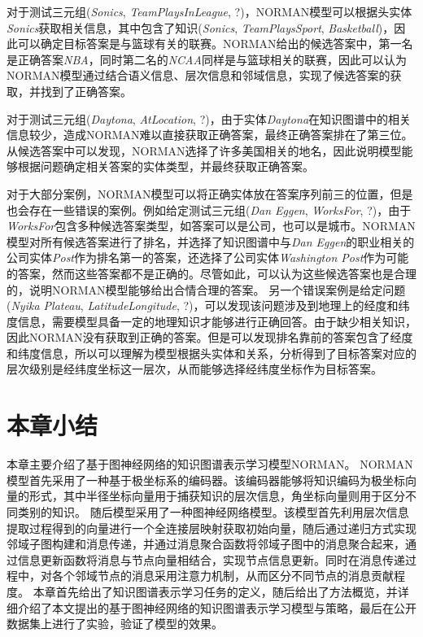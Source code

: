 \documentclass[algorithmlist, AutoFakeBold, AutoFakeSlant, figurelist, tablelist, nomlist, engineering, openany]{seuthesix} %
\begin{document}
对于测试三元组(\textit{Sonics}, \textit{TeamPlaysInLeague}, ?)，NORMAN模型可以根据头实体\textit{Sonics}获取相关信息，其中包含了知识(\textit{Sonics}, \textit{TeamPlaysSport}, \textit{Basketball})，因此可以确定目标答案是与篮球有关的联赛。NORMAN给出的候选答案中，第一名是正确答案\textit{NBA}，同时第二名的\textit{NCAA}同样是与篮球相关的联赛，因此可以认为NORMAN模型通过结合语义信息、层次信息和邻域信息，实现了候选答案的获取，并找到了正确答案。

对于测试三元组(\textit{Daytona}, \textit{AtLocation}, ?)，由于实体\textit{Daytona}在知识图谱中的相关信息较少，造成NORMAN难以直接获取正确答案，最终正确答案排在了第三位。从候选答案中可以发现，NORMAN选择了许多美国相关的地名，因此说明模型能够根据问题确定相关答案的实体类型，并最终获取正确答案。

对于大部分案例，NORMAN模型可以将正确实体放在答案序列前三的位置，但是也会存在一些错误的案例。例如给定测试三元组(\textit{Dan Eggen}, \textit{WorksFor}, ?)，由于\textit{WorksFor}包含多种候选答案类型，如答案可以是公司，也可以是城市。NORMAN模型对所有候选答案进行了排名，并选择了知识图谱中与\textit{Dan Eggen}的职业相关的公司实体\textit{Post}作为排名第一的答案，还选择了公司实体\textit{Washington Post}作为可能的答案，然而这些答案都不是正确的。尽管如此，可以认为这些候选答案也是合理的，说明NORMAN模型能够给出合情合理的答案。
另一个错误案例是给定问题(\textit{Nyika Plateau}, \textit{LatitudeLongitude}, ?)，可以发现该问题涉及到地理上的经度和纬度信息，需要模型具备一定的地理知识才能够进行正确回答。由于缺少相关知识，因此NORMAN没有获取到正确的答案。但是可以发现排名靠前的答案包含了经度和纬度信息，所以可以理解为模型根据头实体和关系，分析得到了目标答案对应的层次级别是经纬度坐标这一层次，从而能够选择经纬度坐标作为目标答案。


\section{本章小结}
本章主要介绍了基于图神经网络的知识图谱表示学习模型NORMAN。
NORMAN模型首先采用了一种基于极坐标系的编码器。该编码器能够将知识编码为极坐标向量的形式，其中半径坐标向量用于捕获知识的层次信息，角坐标向量则用于区分不同类别的知识。
随后模型采用了一种图神经网络模型。该模型首先利用层次信息提取过程得到的向量进行一个全连接层映射获取初始向量，随后通过递归方式实现邻域子图构建和消息传递，并通过消息聚合函数将邻域子图中的消息聚合起来，通过信息更新函数将消息与节点向量相结合，实现节点信息更新。同时在消息传递过程中，对各个邻域节点的消息采用注意力机制，从而区分不同节点的消息贡献程度。
本章首先给出了知识图谱表示学习任务的定义，随后给出了方法概览，并详细介绍了本文提出的基于图神经网络的知识图谱表示学习模型与策略，最后在公开数据集上进行了实验，验证了模型的效果。
\end{document}
